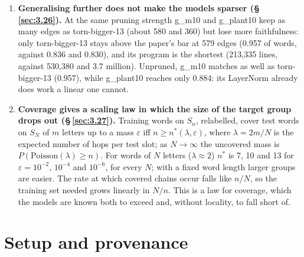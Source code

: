 \documentclass[paper=a4,fontsize=11pt,DIV=11,parskip=half,headings=small,numbers=noendperiod]{scrartcl}
\DeclareRobustCommand{\lead}[1]{\textsf{\bfseries\color{accent}#1}}
\DeclareRobustCommand{\code}[1]{{\fontseries{m}\ttfamily #1}}
\newcommand{\tagpill}[2]{\tcbox[on line,colback=#1,colframe=#1,boxrule=0pt,arc=1.6pt,left=2.4pt,right=2.4pt,top=0.9pt,bottom=0.9pt,boxsep=0pt,tcbox raise base,fontupper={\sffamily\bfseries\fontsize{6.8}{7}\selectfont\color{white}}]{#2}}
\DeclareRobustCommand{\tagnew}{\texorpdfstring{\tagpill{newcol}{NEW}}{[NEW]}}
\begin{document}
\begin{enumerate}
\item \lead{Generalising further does not make the models sparser (\S\,\ref{sec:3.26}).} At the same pruning
  strength \code{g\_\allowbreak{}m10} and \code{g\_\allowbreak{}plant10} keep as many edges as
  \code{torn-\allowbreak{}bigger-\allowbreak{}13} (about 580 and 360) but lose more faithfulness: only
  \code{torn-\allowbreak{}bigger-\allowbreak{}13} stays above the paper’s bar at 579 edges (0.957 of words,
  against 0.836 and 0.830), and its program is the shortest (213,335 lines, against 530,380 and 3.7 million).
  Unpruned, \code{g\_\allowbreak{}m10} matches as well as \code{torn-\allowbreak{}bigger-\allowbreak{}13}
  (0.957), while \code{g\_\allowbreak{}plant10} reaches only 0.884: its LayerNorm already does work a linear one
  cannot.
\item \lead{\tagnew{} Coverage gives a scaling law in which the size of the target group drops out
  (\S\,\ref{sec:3.27}).} Training words on $S_n$, relabelled, cover test words on $S_N$ of $m$ letters up to a
  mass $\varepsilon$ iff $n\ge n^*(\lambda,\varepsilon)$, where $\lambda=2m/N$ is the expected number of hops
  per test slot; as $N\to\infty$ the uncovered mass is $P(\text{Poisson}(\lambda)\ge n)$. For words of $N$
  letters ($\lambda\approx2$) $n^*$ is 7, 10 and 13 for $\varepsilon=10^{-2}$, $10^{-4}$ and $10^{-6}$, for
  every $N$; with a fixed word length larger groups are easier. The rate at which covered chains occur falls
  like $n/N$, so the training set needed grows linearly in $N/n$. This is a law for coverage, which the models
  are known both to exceed and, without locality, to fall short of.
\end{enumerate}

\section{Setup and provenance}\label{sec:2}
\end{document}

